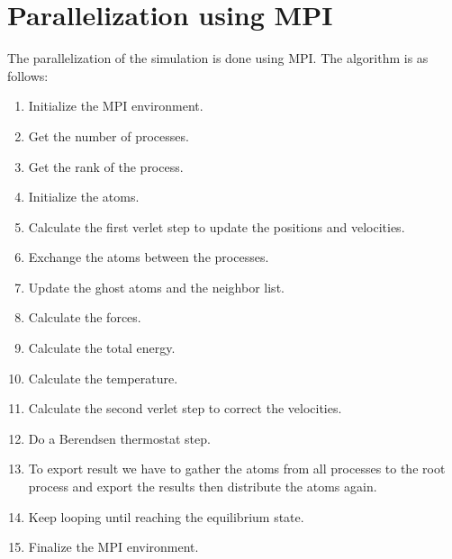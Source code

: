 \section{Parallelization using MPI}
The parallelization of the simulation is done using MPI. The algorithm is as follows:
\begin{enumerate}
    \item Initialize the MPI environment.
    \item Get the number of processes.
    \item Get the rank of the process.
    \item Initialize the atoms.
    \item Calculate the first verlet step to update the positions and velocities.
    \item Exchange the atoms between the processes.
    \item Update the ghost atoms and the neighbor list.
    \item Calculate the forces.
    \item Calculate the total energy.
    \item Calculate the temperature.
    \item Calculate the second verlet step to correct the velocities.
    \item Do a Berendsen thermostat step.
    \item To export result we have to gather the atoms from all processes to the root process and export the results then distribute the atoms again.
    \item Keep looping until reaching the equilibrium state.
    \item Finalize the MPI environment.
\end{enumerate}
